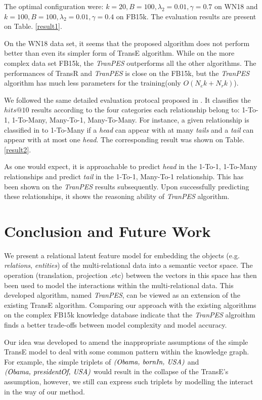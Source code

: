 \documentclass[10pt,journal]{IEEEtran}
\begin{document}
The optimal configuration were: $k=20, B = 100, \lambda_2=0.01, \gamma=0.7$ on WN18 and $k=100, B=100, \lambda_2 = 0.01, \gamma=0.4$ on FB15k. The evaluation results are present on Table. \ref{result1}.

On the WN18 data set, it seems that the proposed algorithm does not perform better than even its simpler form of TransE algorithm. While on the more complex data set FB15k, the \emph{TranPES} outperforms all the other algorithms.  The performances of TransR and \emph{TranPES} is close on the FB15k, but the \emph{TranPES} algorithm has much less parameters for the training(only $O(N_ek+N_rk)$).

We followed the same detailed evaluation protocal proposed in \cite{bordes_translating_2013}. It classifies the $hits@10$ results according to the four categories each relationship belong to:  1-To-1, 1-To-Many, Many-To-1, Many-To-Many. For instance, a given relationship is classified in to 1-To-Many if a \emph{head} can appear with at many \emph{tails} and a \emph{tail} can appear with at most one \emph{head}.  The corresponding result was shown on Table. \ref{result2}. 

As one would expect, it is approachable to predict \emph{head} in the 1-To-1, 1-To-Many  relationships and predict \emph{tail} in the 1-To-1, Many-To-1 relationship. This has been shown on the \emph{TranPES} results subsequently. Upon successfully predicting these relationships, it shows the reasoning ability of \emph{TranPES} algorithm.




\section{Conclusion and Future Work}
We present a relational latent feature model for embedding the objects (e.g. \emph{relations}, \emph{entities}) of the multi-relational data into a semantic vector space.  The operation (translation, projection .etc) between the vectors in this space has then been used to model the interactions within the multi-relational data. This developed algorithm, named \emph{TranPES}, can be viewed as an extension of the existing TransE algorithm. Comparing our approach with the existing algorithms on the complex FB15k knowledge database indicate that the \emph{TranPES} algroithm finds a better trade-offs between model complexity and model accuracy.

Our idea was developed to amend the inappropriate assumptions of the simple TransE model to deal with some common pattern within the knowledge graph. For example, the simple triplets of $\emph{(Obama, bornIn, USA)}$ and $\emph{(Obama, presidentOf, USA)}$ would result in the collapse of the TransE's assumption, however, we still can express such triplets by modelling the interact in the way of our method.
\end{document}
